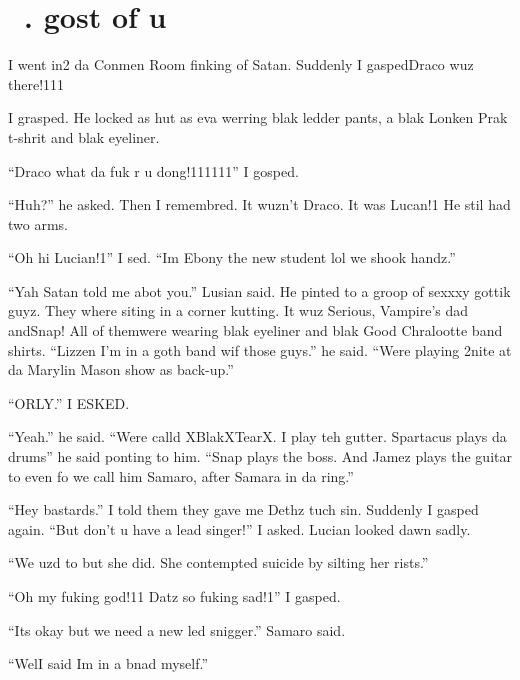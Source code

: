 \section{\chaptername~\thesection. gost of u}


\XXX{\Xfill 666\Xfill}

I went in2 da Conmen Room finking of Satan. Suddenly I gasped\dotfill Draco wuz there!111

I grasped. He locked as hut as eva werring blak ledder pants, a blak Lonken Prak t-shrit and blak eyeliner.

\enquote{Draco what da fuk r u dong!111111} I gosped.

\enquote{Huh?} he asked. Then I remembred. It wuzn't Draco. It was Lucan!1 He stil had two arms.

\enquote{Oh hi Lucian!1} I sed. \enquote{Im Ebony the new student lol we shook handz.}

\enquote{Yah Satan told me abot you.} Lusian said. He pinted to a groop of sexxxy gottik guyz. They where siting in a corner kutting. It wuz Serious, Vampire's dad and\dotfill Snap! All of them\newline were wearing blak eyeliner and blak Good Chralootte band shirts. \enquote{Lizzen I'm in a goth band wif those guys.} he said. \enquote{Were playing 2nite at da Marylin Mason show as back-up.}

\enquote{ORLY.} I ESKED\@.

\enquote{Yeah.} he said. \enquote{Were calld XBlakXTearX. I play teh gutter. Spartacus plays da drums} he said ponting to him. \enquote{Snap plays the boss. And Jamez plays the guitar to even fo we call him Samaro, after Samara in da ring.}

\enquote{Hey bastards.} I told them they gave me Dethz tuch sin. Suddenly I gasped again. \enquote{But don't u have a lead singer!} I asked. Lucian looked dawn sadly.

\enquote{We uzd to but she did. She contempted suicide by silting her rists.}

\enquote{Oh my fuking god!11 Datz so fuking sad!1} I gasped.

\enquote{Its okay but we need a new led snigger.} Samaro said.

\enquote{Wel\dotfill I said Im in a bnad myself.}

